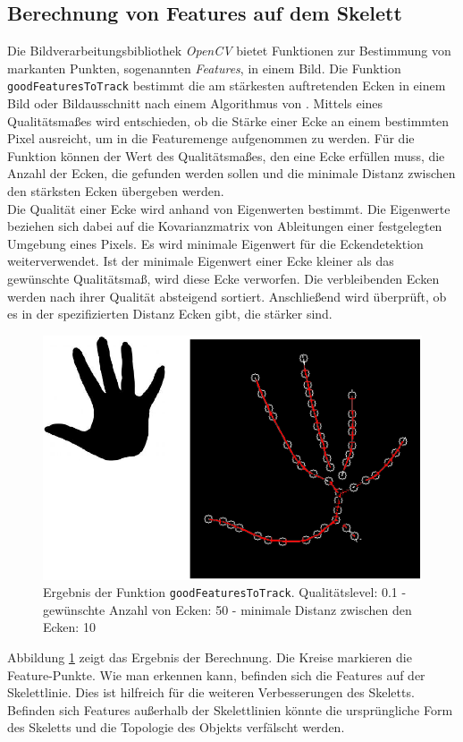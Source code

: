 \subsection{Berechnung von Features auf dem Skelett}
Die Bildverarbeitungsbibliothek \emph{OpenCV} bietet Funktionen zur Bestimmung von markanten Punkten, sogenannten \emph{Features},
in einem Bild. Die Funktion \texttt{goodFeaturesToTrack} bestimmt die am stärkesten auftretenden Ecken in einem Bild oder Bildausschnitt nach einem Algorithmus von \cite{goodfeatures}. Mittels eines Qualitätsmaßes wird entschieden, ob die Stärke einer
Ecke an einem bestimmten Pixel ausreicht, um in die Featuremenge aufgenommen zu werden. Für die
Funktion können der Wert des Qualitätsmaßes, den eine Ecke erfüllen muss, die Anzahl der Ecken, die gefunden werden sollen und die
minimale Distanz zwischen den stärksten Ecken übergeben werden.\\
Die Qualität einer Ecke wird anhand von Eigenwerten bestimmt. Die Eigenwerte beziehen sich dabei auf 
die Kovarianzmatrix von Ableitungen einer festgelegten Umgebung eines Pixels. Es wird minimale Eigenwert
für die Eckendetektion weiterverwendet. Ist der minimale Eigenwert einer Ecke kleiner als das gewünschte
Qualitätsmaß, wird diese Ecke verworfen. Die verbleibenden Ecken werden nach ihrer Qualität absteigend sortiert. Anschließend wird überprüft, ob es in der spezifizierten Distanz Ecken gibt, die stärker sind. 
\begin{figure}[h]
\centering
\includegraphics[width=0.4\linewidth]{./fig/features}
\caption{Ergebnis der Funktion \texttt{goodFeaturesToTrack}. Qualitätslevel: 0.1 - gewünschte Anzahl von Ecken: 50 - minimale Distanz zwischen den Ecken: 10}
\label{fig:features}
\end{figure}
Abbildung \ref{fig:features} zeigt das Ergebnis der Berechnung. Die Kreise markieren die Feature-Punkte. Wie man erkennen kann, befinden sich die Features auf der Skelettlinie. Dies ist hilfreich für die weiteren
Verbesserungen des Skeletts. Befinden sich Features außerhalb der Skelettlinien könnte die ursprüngliche Form des Skeletts und die Topologie des Objekts verfälscht werden.
